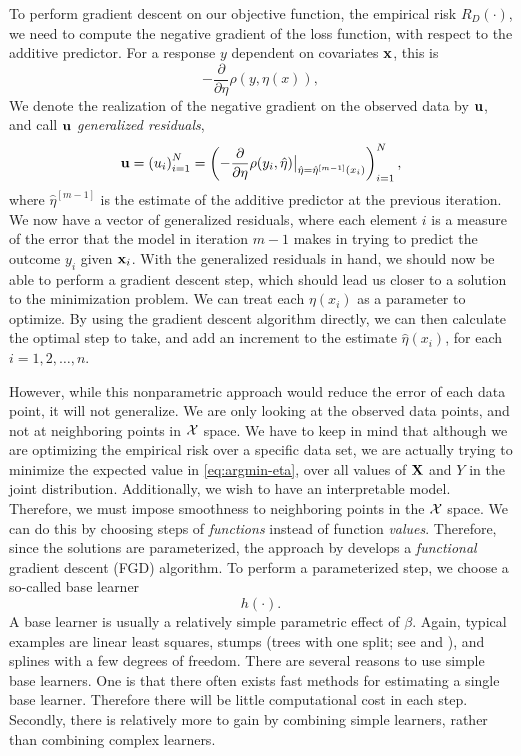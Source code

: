 To perform gradient descent on our objective function, the empirical risk $R_D(\cdot)$,
we need to compute the negative gradient of the loss function, with respect to the additive predictor. For a response $y$ dependent on
covariates $\mathbf{x}$, this is
\begin{equation}
    -\frac{\partial}{\partial\eta} \rho(y,\eta(x)),
\end{equation}
We denote the realization of the negative gradient on the observed data by $\mathbf{u}$, and call $\mathbf{u}$ \textit{generalized residuals},
\begin{equation}
    \mathbf{u}=\left(u_i\right)_{i=1}^N=\left(-\frac{\partial}{\partial \eta}\rho(y_i, \hat{\eta})\big\rvert_{\hat{\eta}=\hat{\eta}^{[m-1]}(x_i)}\right)_{i=1}^N,
\end{equation}
where $\hat{\eta}^{[m-1]}$ is the estimate of the additive predictor at the previous iteration.
We now have a vector of generalized residuals, where each element $i$ is a measure of the error that the model in iteration $m-1$ makes
in trying to predict the outcome $y_i$ given $\mathbf{x}_i$.
With the generalized residuals in hand, we should now be able to perform a gradient descent step, which should lead us closer to a solution
to the minimization problem. We can treat each $\eta(x_i)$ as a parameter to optimize. By using the gradient descent algorithm directly, we
can then calculate the optimal step to take, and add an increment to the estimate $\hat{\eta}(x_i)$, for each $i=1,2,\ldots,n$.

However, while this nonparametric approach would reduce the error of each data point, it will not generalize.
We are only looking at the observed data points, and not at neighboring points in $\mathcal{X}$ space.
We have to keep in mind that although we are optimizing the empirical risk over a specific data set,
we are actually trying to minimize the expected value in \eqref{eq:argmin-eta}, over all values of $\mathbf{X}$ and $Y$ in the joint distribution.
Additionally, we wish to have an interpretable model.
Therefore, we must impose smoothness to neighboring points in the $\mathcal{X}$ space. We can do this by choosing steps of
\textit{functions} instead of function \textit{values}. Therefore, since the solutions are parameterized,
the approach by \citet{friedman2001} develops a \textit{functional} gradient descent (FGD) algorithm.
To perform a parameterized step, we choose a so-called base learner
\begin{equation}
    h(\cdot).
\end{equation}
A base learner is usually a relatively simple parametric effect of $\beta$. Again, typical examples are linear least squares, stumps (trees with one split; see \citet{buhlmann2007} and \citet{ESL}), and splines with a few degrees of freedom.
There are several reasons to use simple base learners. One is that there often exists fast methods for estimating a single base learner.
Therefore there will be little computational cost in each step. Secondly, there is relatively more to gain by combining simple learners,
rather than combining complex learners.

